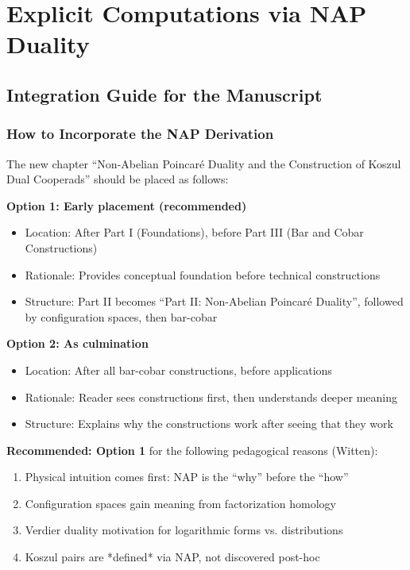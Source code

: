 \chapter{Explicit Computations via NAP Duality}
\label{chap:NAP-computations}

\section{Integration Guide for the Manuscript}

\subsection{How to Incorporate the NAP Derivation}

\begin{remark}\label{rem:NAP-placement}
The new chapter ``Non-Abelian Poincaré Duality and the Construction of Koszul Dual Cooperads'' should be placed as follows:

\textbf{Option 1: Early placement (recommended)}
\begin{itemize}
\item Location: After Part I (Foundations), before Part III (Bar and Cobar Constructions)
\item Rationale: Provides conceptual foundation before technical constructions
\item Structure: Part II becomes ``Part II: Non-Abelian Poincaré Duality'', followed by configuration spaces, then bar-cobar
\end{itemize}

\textbf{Option 2: As culmination}
\begin{itemize}
\item Location: After all bar-cobar constructions, before applications
\item Rationale: Reader sees constructions first, then understands deeper meaning
\item Structure: Explains why the constructions work after seeing that they work
\end{itemize}

\textbf{Recommended: Option 1} for the following pedagogical reasons (Witten):
\begin{enumerate}
\item Physical intuition comes first: NAP is the ``why'' before the ``how''
\item Configuration spaces gain meaning from factorization homology
\item Verdier duality motivation for logarithmic forms vs. distributions
\item Koszul pairs are *defined* via NAP, not discovered post-hoc
\end{enumerate}
\end{remark}

